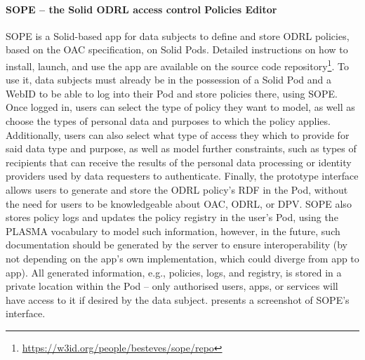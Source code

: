 \paragraph{SOPE -- the Solid ODRL access control Policies Editor}
SOPE is a Solid-based app for data subjects to define and store ODRL policies, based on the OAC specification, on Solid Pods.
Detailed instructions on how to install, launch, and use the app are available on the source code repository\footnote{\url{https://w3id.org/people/besteves/sope/repo}}.
To use it, data subjects must already be in the possession of a Solid Pod and a WebID to be able to log into their Pod and store policies there, using SOPE.
Once logged in, users can select the type of policy they want to model, as well as choose the types of personal data and purposes to which the policy applies.
Additionally, users can also select what type of access they which to provide for said data type and purpose, as well as model further constraints, such as types of recipients that can receive the results of the personal data processing or identity providers used by data requesters to authenticate.
Finally, the prototype interface allows users to generate and store the ODRL policy's RDF in the Pod, without the need for users to be knowledgeable about OAC, ODRL, or DPV.
SOPE also stores policy logs and updates the policy registry in the user's Pod, using the PLASMA vocabulary to model such information, however, in the future, such documentation should be generated by the server to ensure interoperability (by not depending on the app's own implementation, which could diverge from app to app).
All generated information, e.g., policies, logs, and registry, is stored in a private location within the Pod -- only authorised users, apps, or services will have access to it if desired by the data subject.
 presents a screenshot of SOPE's interface.

